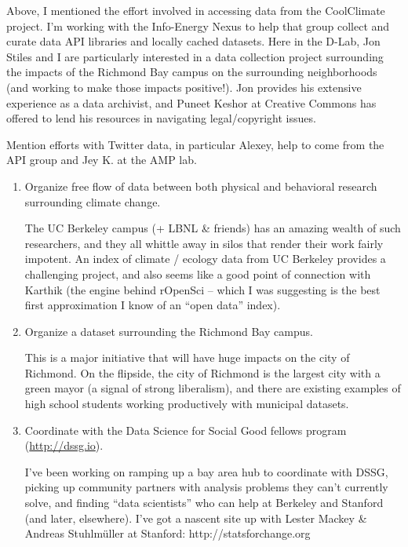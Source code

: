 Above, I mentioned the effort involved in accessing data from the CoolClimate
project. I'm working with the Info-Energy Nexus to help that group collect and
curate data API libraries and locally cached datasets. Here in the D-Lab, Jon
Stiles and I are particularly interested in a data collection project
surrounding the impacts of the Richmond Bay campus on the surrounding
neighborhoods (and working to make those impacts positive!). Jon provides his
extensive experience as a data archivist, and Puneet Keshor at Creative Commons
has offered to lend his resources in navigating legal/copyright issues.

Mention efforts with Twitter data, in particular Alexey, help to come from the
API group and Jey K. at the AMP lab.

\begin{enumerate}
    \item Organize free flow of data between both physical and behavioral
        research surrounding climate change.

        The UC Berkeley campus (+ LBNL \& friends) has an amazing wealth of such
        researchers, and they all whittle away in silos that render their work
        fairly impotent. An index of climate / ecology data from UC Berkeley
        provides a challenging project, and also seems like a good point of
        connection with Karthik (the engine behind rOpenSci -- which I was
        suggesting is the best first approximation I know of an “open data”
        index).

    \item Organize a dataset surrounding the Richmond Bay campus.

        This is a major initiative that will have huge impacts on the city of
        Richmond.  On the flipside, the city of Richmond is the largest city
        with a green mayor (a signal of strong liberalism), and there are
        existing examples of high school students working productively with
        municipal datasets.

    \item Coordinate with the Data Science for Social Good fellows program
        (\url{http://dssg.io}).

        I've been working on ramping up a bay area hub to coordinate with DSSG,
        picking up community partners with analysis problems they can't
        currently solve, and finding “data scientists” who can help at Berkeley
        and Stanford (and later, elsewhere). I've got a nascent site up with
        Lester Mackey \& Andreas Stuhlmüller at Stanford:
        http://statsforchange.org


\end{enumerate}
